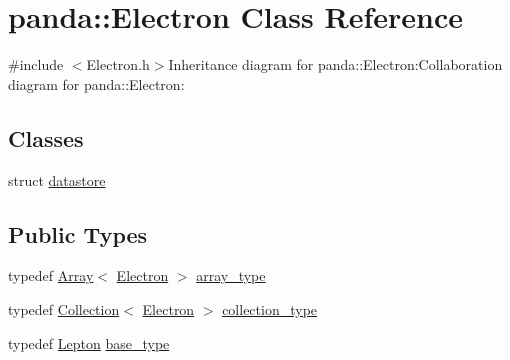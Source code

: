 \hypertarget{classpanda_1_1Electron}{
\section{panda::Electron Class Reference}
\label{classpanda_1_1Electron}
}


{\ttfamily \#include $<$Electron.h$>$}Inheritance diagram for panda::Electron:Collaboration diagram for panda::Electron:\subsection*{Classes}
\begin{DoxyCompactItemize}
\item 
struct \hyperlink{structpanda_1_1Electron_1_1datastore}{datastore}
\end{DoxyCompactItemize}
\subsection*{Public Types}
\begin{DoxyCompactItemize}
\item 
typedef \hyperlink{classpanda_1_1Array}{Array}$<$ \hyperlink{classpanda_1_1Electron}{Electron} $>$ \hyperlink{classpanda_1_1Electron_a7bfeb05c19bc521a2e12e1704cc16958}{array\_\-type}
\item 
typedef \hyperlink{classpanda_1_1Collection}{Collection}$<$ \hyperlink{classpanda_1_1Electron}{Electron} $>$ \hyperlink{classpanda_1_1Electron_abf729472e92b96747fc90029ca7ac3a1}{collection\_\-type}
\item 
typedef \hyperlink{classpanda_1_1Lepton}{Lepton} \hyperlink{classpanda_1_1Electron_a0fdcdc003b2db72940f10d648b3833a6}{base\_\-type}
\end{DoxyCompactItemize}
